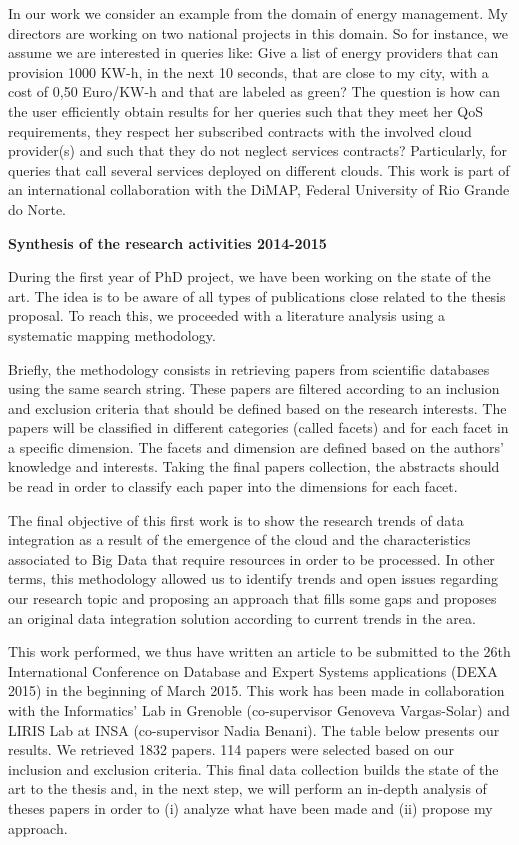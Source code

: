 \documentclass[12pt,a4paper,oneside]{report}
\begin{document}
In our work we consider an example from the domain of energy management. My directors are working on two national projects in this domain. So for instance, we assume we are interested in queries like: Give a list of energy providers that can provision 1000 KW-h, in the next 10 seconds, that are close to my city, with a cost of 0,50 Euro/KW-h and that are labeled as green? The question is how can the user efficiently obtain results for her queries such that they meet her QoS requirements, they respect her subscribed contracts with the involved cloud provider(s) and such that they do not neglect services contracts? Particularly, for queries that call several services deployed on different clouds. This work is part of an international collaboration with the DiMAP, Federal University of Rio Grande do Norte.

\begin{flushleft}
\textbf{Synthesis of the research activities 2014-2015}\\
\end{flushleft}
During the first year of PhD project, we have been working on the state of the art. The idea is to be aware of all types of publications close related to the thesis proposal. To reach this, we proceeded with a literature analysis using a systematic mapping methodology. 

Briefly, the methodology consists in retrieving papers from scientific databases using the same search string. These papers are filtered according to an inclusion and exclusion criteria that should be defined based on the research interests. The papers will be classified in different categories (called facets) and for each facet in a specific dimension. The facets and dimension are defined based on the authors’ knowledge and interests. Taking the final papers collection, the abstracts should be read in order to classify each paper into the dimensions for each facet. 

The final objective of this first work is to show the research trends of data integration as a result of the emergence of the cloud and the characteristics associated to Big Data that require resources in order to be processed. In other terms, this methodology allowed us to identify trends and open issues regarding our research topic and proposing an approach that fills some gaps and proposes an original data integration solution according to current trends in the area.

This work performed, we thus have written an article to be submitted to the 26th International Conference on Database and Expert Systems applications (DEXA 2015) in the beginning of March 2015. This work has been made in collaboration with the Informatics’ Lab in Grenoble (co-supervisor Genoveva Vargas-Solar) and LIRIS Lab at INSA (co-supervisor Nadia Benani). The table below presents our results. We retrieved 1832 papers. 114 papers were selected based on our inclusion and exclusion criteria. This final data collection builds the state of the art to the thesis and, in the next step, we will perform an in-depth analysis of theses papers in order to (i) analyze what have been made and (ii) propose my approach.  
\end{document}
